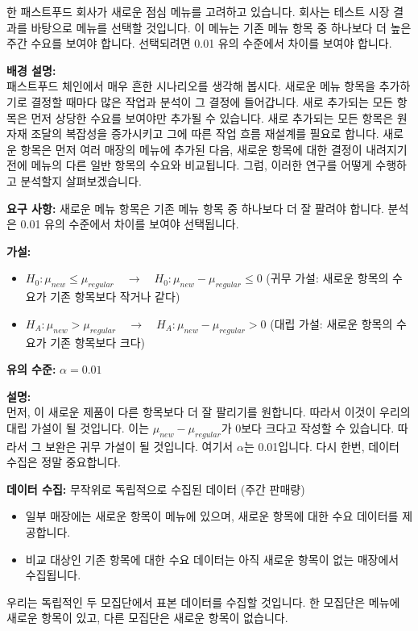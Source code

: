 \documentclass[11pt,a4paper]{article}
\theoremstyle{definition}
\begin{document}
\begin{examplebox}[title=제품 테스트 (1/5): 새로운 점심 메뉴 도입]
한 패스트푸드 회사가 새로운 점심 메뉴를 고려하고 있습니다. 회사는 테스트 시장 결과를 바탕으로 메뉴를 선택할 것입니다. 이 메뉴는 기존 메뉴 항목 중 하나보다 더 높은 주간 수요를 보여야 합니다. 선택되려면 0.01 유의 수준에서 차이를 보여야 합니다.

\textbf{배경 설명:} \\
패스트푸드 체인에서 매우 흔한 시나리오를 생각해 봅시다. 새로운 메뉴 항목을 추가하기로 결정할 때마다 많은 작업과 분석이 그 결정에 들어갑니다. 새로 추가되는 모든 항목은 먼저 상당한 수요를 보여야만 추가될 수 있습니다. 새로 추가되는 모든 항목은 원자재 조달의 복잡성을 증가시키고 그에 따른 작업 흐름 재설계를 필요로 합니다. 새로운 항목은 먼저 여러 매장의 메뉴에 추가된 다음, 새로운 항목에 대한 결정이 내려지기 전에 메뉴의 다른 일반 항목의 수요와 비교됩니다. 그럼, 이러한 연구를 어떻게 수행하고 분석할지 살펴보겠습니다.
\end{examplebox}

\begin{infobox}[title=제품 테스트 (2/5): 가설 설정 (새 메뉴)]
\textbf{요구 사항:} 새로운 메뉴 항목은 기존 메뉴 항목 중 하나보다 더 잘 팔려야 합니다. 분석은 0.01 유의 수준에서 차이를 보여야 선택됩니다.

\textbf{가설:}
\begin{itemize}
    \item $H_0 : \mu_{new} \le \mu_{regular} \quad \rightarrow \quad H_0 : \mu_{new} - \mu_{regular} \le 0$ (귀무 가설: 새로운 항목의 수요가 기존 항목보다 작거나 같다)
    \item $H_A : \mu_{new} > \mu_{regular} \quad \rightarrow \quad H_A : \mu_{new} - \mu_{regular} > 0$ (대립 가설: 새로운 항목의 수요가 기존 항목보다 크다)
\end{itemize}
\textbf{유의 수준:} $\alpha = 0.01$

\textbf{설명:} \\
먼저, 이 새로운 제품이 다른 항목보다 더 잘 팔리기를 원합니다. 따라서 이것이 우리의 대립 가설이 될 것입니다. 이는 $\mu_{new} - \mu_{regular}$가 0보다 크다고 작성할 수 있습니다. 따라서 그 보완은 귀무 가설이 될 것입니다. 여기서 $\alpha$는 0.01입니다. 다시 한번, 데이터 수집은 정말 중요합니다.
\end{infobox}

\begin{infobox}[title=제품 테스트 (3/5): 데이터 수집 방법]
\textbf{데이터 수집:} 무작위로 독립적으로 수집된 데이터 (주간 판매량)
\begin{itemize}
    \item 일부 매장에는 새로운 항목이 메뉴에 있으며, 새로운 항목에 대한 수요 데이터를 제공합니다.
    \item 비교 대상인 기존 항목에 대한 수요 데이터는 아직 새로운 항목이 없는 매장에서 수집됩니다.
\end{itemize}
우리는 독립적인 두 모집단에서 표본 데이터를 수집할 것입니다. 한 모집단은 메뉴에 새로운 항목이 있고, 다른 모집단은 새로운 항목이 없습니다.
\end{infobox}
\end{document}
